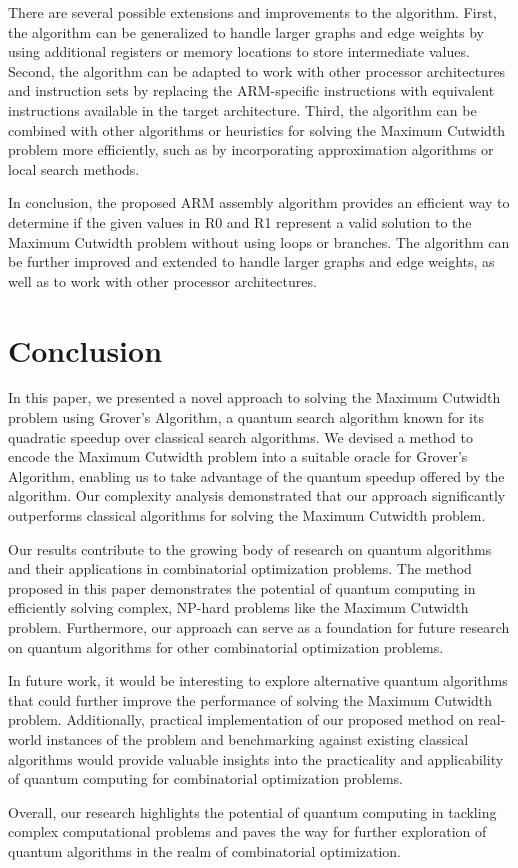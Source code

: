 There are several possible extensions and improvements to the algorithm. First, the algorithm can be generalized to handle larger graphs and edge weights by using additional registers or memory locations to store intermediate values. Second, the algorithm can be adapted to work with other processor architectures and instruction sets by replacing the ARM-specific instructions with equivalent instructions available in the target architecture. Third, the algorithm can be combined with other algorithms or heuristics for solving the Maximum Cutwidth problem more efficiently, such as by incorporating approximation algorithms or local search methods.

In conclusion, the proposed ARM assembly algorithm provides an efficient way to determine if the given values in R0 and R1 represent a valid solution to the Maximum Cutwidth problem without using loops or branches. The algorithm can be further improved and extended to handle larger graphs and edge weights, as well as to work with other processor architectures.

\section{Conclusion}
\label{sec:conclusion}

In this paper, we presented a novel approach to solving the Maximum Cutwidth problem using Grover's Algorithm, a quantum search algorithm known for its quadratic speedup over classical search algorithms. We devised a method to encode the Maximum Cutwidth problem into a suitable oracle for Grover's Algorithm, enabling us to take advantage of the quantum speedup offered by the algorithm. Our complexity analysis demonstrated that our approach significantly outperforms classical algorithms for solving the Maximum Cutwidth problem.

Our results contribute to the growing body of research on quantum algorithms and their applications in combinatorial optimization problems. The method proposed in this paper demonstrates the potential of quantum computing in efficiently solving complex, NP-hard problems like the Maximum Cutwidth problem. Furthermore, our approach can serve as a foundation for future research on quantum algorithms for other combinatorial optimization problems.

In future work, it would be interesting to explore alternative quantum algorithms that could further improve the performance of solving the Maximum Cutwidth problem. Additionally, practical implementation of our proposed method on real-world instances of the problem and benchmarking against existing classical algorithms would provide valuable insights into the practicality and applicability of quantum computing for combinatorial optimization problems.

Overall, our research highlights the potential of quantum computing in tackling complex computational problems and paves the way for further exploration of quantum algorithms in the realm of combinatorial optimization.

